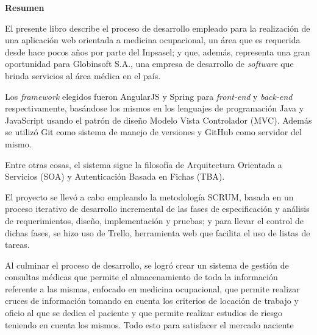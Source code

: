 \begin{center}
    \textbf{Resumen}
\end{center}

El presente libro describe el proceso de desarrollo empleado para la realización de una aplicación web orientada a medicina ocupacional, un área que es requerida desde hace pocos años por parte del Inpsasel; y que, además, representa una gran oportunidad para Globinsoft S.A., una empresa de desarrollo de \textit{software} que brinda servicios al área médica en el país.

Los \textit{framework} elegidos fueron AngularJS y Spring para \textit{front-end} y \textit{back-end} respectivamente, basándose los mismos en los lenguajes de programación Java y JavaScript usando el patrón de diseño Modelo Vista Controlador (MVC). Además se utilizó Git como sistema de manejo de versiones y GitHub como servidor del mismo.

Entre otras cosas, el sistema sigue la filosofía de Arquitectura Orientada a Servicios (SOA) y Autenticación Basada en Fichas (TBA).

El proyecto se llevó a cabo empleando la metodología SCRUM, basada en un proceso
iterativo de desarrollo incremental de las fases de especificación y análisis de requerimientos,
diseño, implementación y pruebas; y para llevar el control de dichas fases, se hizo uso de Trello, herramienta web que facilita el uso de listas de tareas.

Al culminar el proceso de desarrollo, se logró crear un sistema de gestión de consultas médicas que permite el almacenamiento de toda la información referente a las mismas, enfocado en medicina ocupacional, que permite realizar cruces de información tomando en cuenta los criterios de locación de trabajo y oficio al que se dedica el paciente y que permite realizar estudios de riesgo teniendo en cuenta los mismos. Todo esto para satisfacer el mercado naciente 

\pagebreak